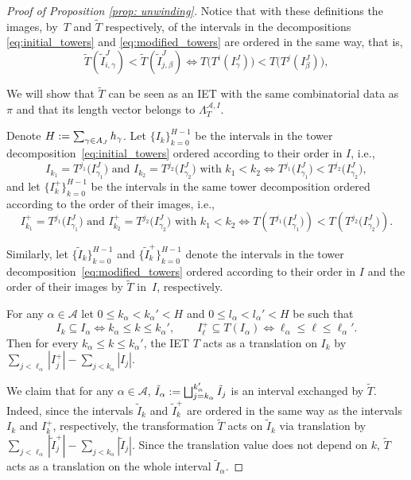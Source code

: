 \documentclass[10pt,a4paper]{amsart}
\let\oldbigsqcup\bigsqcup
\renewcommand{\bigsqcup}{\mathop{\textstyle\oldbigsqcup}\displaylimits}
\theoremstyle{plain}
\theoremstyle{definition}
\newcommand{\A}{\mathcal{A}}
\begin{document}
\begin{proof}[Proof of Proposition \ref{prop: unwinding}]
Notice that with these definitions the images, by~$T$ and $\tilde T$ respectively, of the intervals in the decompositions \eqref{eq:initial_towers} and \eqref{eq:modified_towers} are ordered in the same way, that is,
\[
 \tilde T(\tilde I_{i, \gamma}^J) < \tilde T(\tilde I_{j, \beta}^J ) \iff T \big( T^i(I_\gamma^J)\big) < T \big( T^j(I_\beta^J) \big),
\]

We will show that $\tilde T$ can be seen as an IET with the same combinatorial data as~$\pi$ and that its length vector belongs to $\Lambda^{\A, I}_T$.

Denote $H:= \sum_{\gamma\in\mathcal \A_J}h_{\gamma}$. Let $\{I_k\}_{k = 0}^{H - 1}$ be the intervals in the tower decomposition~\eqref{eq:initial_towers} ordered according to their order in $I$, i.e.,
\[
I_{k_1}=T^{j_1}\big(I_{\gamma_1}^J\big)\text{ and }I_{k_2}=T^{j_2}\big(I_{\gamma_2}^J\big)\text{ with }k_1<k_2\iff T^{j_1}\big(I_{\gamma_1}^J\big)<T^{j_2}\big(I_{\gamma_2}^J\big),
\]
and let $\{I_k^+\}_{k = 0}^{H - 1}$ be the intervals in the same tower decomposition ordered according to the order of their images, i.e.,
\[
I_{k_1}^+=T^{j_1}\big(I_{\gamma_1}^J\big)\text{ and }I_{k_2}^+=T^{j_2}\big(I_{\gamma_2}^J\big)\text{ with }k_1<k_2\iff T\left(T^{j_1}\big(I_{\gamma_1}^J\big)\right)<T\left(T^{j_2}\big(I_{\gamma_2}^J\big)\right).
\]

Similarly, let $\{\tilde I_k\}_{k = 0}^{H - 1}$ and $\{\tilde I_k^+\}_{k = 0}^{H - 1}$ denote the intervals in the tower decomposition~\eqref{eq:modified_towers} ordered according to their order in $I$ and the order of their images by $\tilde T$ in~$I$, respectively.

For any $\alpha \in \A$ let $0\le k_\alpha< k_{\alpha}' < H$ and $0\le l_\alpha< l_{\alpha}' < H$ be such that
\[
I_{k}\subseteq I_{\alpha}\iff k_{\alpha}\le k\le k_{\alpha}', \qquad I_{\ell}^+\subseteq T(I_{\alpha})\iff \ell_{\alpha}\le \ell\le \ell_{\alpha}'.
\]
Then for every $k_{\alpha}\le k\le k_{\alpha}'$, the IET $T$ acts as a translation on $I_{k}$ by $\sum_{j<\ell_\alpha}|I_j^+|-\sum_{j<k_\alpha}|I_j|$.

We claim that for any $\alpha \in \A$, $\tilde I_{\alpha}:=\bigsqcup_{j=k_\alpha}^{k_\alpha'}\tilde I_j$ is an interval exchanged by $\tilde T$.
Indeed, since the intervals $\tilde I_k$ and $\tilde I_k^+$ are ordered in the same way as the intervals $I_k$ and $I_k^+$, respectively, the transformation $\tilde{T}$ acts on $\tilde I_k$ via translation by $\sum_{j<\ell_\alpha}|\tilde I_j^+|-\sum_{j<k_\alpha}|\tilde I_j|$. Since the translation value does not depend on $k$, $\tilde{T}$ acts as a translation on the whole interval $\tilde I_{\alpha}$.


\end{proof}
\end{document}
